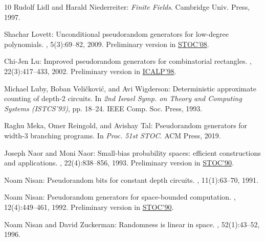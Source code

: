 \documentclass[11pt]{article}
\numberwithin{equation}{section}
\theoremstyle{definition}
\theoremstyle{plain}
\begin{document}
\begin{thebibliography}{10}
{\sc Rudolf Lidl and Harald Niederreiter}: {\em Finite Fields}.
\newblock Cambridge Univ. Press, 1997.

{\sc Shachar Lovett}: Unconditional pseudorandom generators for low-degree
  polynomials.
, 5(3):69--82, 2009.
\newblock Preliminary version in
  \href{https://doi.org/10.1145/1374376.1374455}{STOC'08}.

{\sc Chi-Jen Lu}: Improved pseudorandom generators for combinatorial
  rectangles.
, 22(3):417--433, 2002.
\newblock Preliminary version in
  \href{https://doi.org/10.1007/BFb0055056}{ICALP'98}.
\newblock [\epfmtdoi{10.1007/s004930200021}]

{\sc Michael Luby, Boban Veli{\v c}kovi{\'c}, and Avi Wigderson}: Deterministic
  approximate counting of depth-2 circuits.
\newblock In {\em 2nd Israel Symp. on Theory and Computing Systems (ISTCS'93)},
  pp. 18--24. IEEE Comp. Soc. Press, 1993.

{\sc Raghu Meka, Omer Reingold, and Avishay Tal}: Pseudorandom generators for
  width-3 branching programs.
\newblock In {\em Proc. 51st STOC}. ACM Press, 2019.

{\sc Joseph Naor and Moni Naor}: Small-bias probability spaces: efficient
  constructions and applications.
, 22(4):838--856, 1993.
\newblock Preliminary version in
  \href{https://doi.org/10.1145/100216.100244}{STOC'90}.
\newblock [\epfmtdoi{10.1137/0222053}]

{\sc Noam Nisan}: Pseudorandom bits for constant depth circuits.
, 11(1):63--70, 1991.
\newblock [\epfmtdoi{10.1007/BF01375474}]

{\sc Noam Nisan}: Pseudorandom generators for space-bounded computation.
, 12(4):449--461, 1992.
\newblock Preliminary version in
  \href{https://doi.org/10.1145/100216.100242}{STOC'90}.
\newblock [\epfmtdoi{10.1007/BF01305237}]

{\sc Noam Nisan and David Zuckerman}: Randomness is linear in space.
, 52(1):43--52, 1996.


\end{thebibliography}
\end{document}
